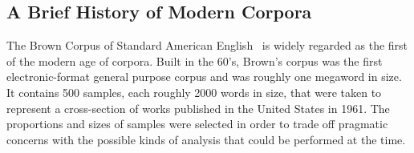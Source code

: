 % 
% 
% 
% 
% 
% 
% 
% 
% 



\subsection{A Brief History of Modern Corpora}
The Brown Corpus of Standard American English~\cite{francis1961brown}%
is widely regarded as the first of the modern age of corpora.  Built in the 60's, Brown's corpus was the first electronic-format general purpose corpus and was roughly one megaword in size.%
It contains 500 samples, each roughly 2000 words in size, that were taken to represent a cross-section of works published in the United States in 1961.  The proportions and sizes of samples were selected in order to trade off pragmatic concerns with the possible kinds of analysis that could be performed at the time.

